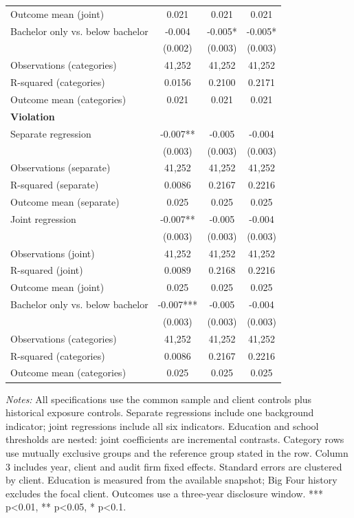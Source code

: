 \begin{table}[htbp]
\begin{threeparttable}
\begin{tabular}{p{}ccc}
Outcome mean (joint) & 0.021 & 0.021 & 0.021 \\
Bachelor only vs. below bachelor & -0.004 & -0.005* & -0.005* \\
 & (0.002) & (0.003) & (0.003) \\
Observations (categories) & 41,252 & 41,252 & 41,252 \\
R-squared (categories) & 0.0156 & 0.2100 & 0.2171 \\
Outcome mean (categories) & 0.021 & 0.021 & 0.021 \\
\multicolumn{4}{l}{\textbf{Violation}} \\
Separate regression & -0.007** & -0.005 & -0.004 \\
 & (0.003) & (0.003) & (0.003) \\
Observations (separate) & 41,252 & 41,252 & 41,252 \\
R-squared (separate) & 0.0086 & 0.2167 & 0.2216 \\
Outcome mean (separate) & 0.025 & 0.025 & 0.025 \\
Joint regression & -0.007** & -0.005 & -0.004 \\
 & (0.003) & (0.003) & (0.003) \\
Observations (joint) & 41,252 & 41,252 & 41,252 \\
R-squared (joint) & 0.0089 & 0.2168 & 0.2216 \\
Outcome mean (joint) & 0.025 & 0.025 & 0.025 \\
Bachelor only vs. below bachelor & -0.007*** & -0.005 & -0.004 \\
 & (0.003) & (0.003) & (0.003) \\
Observations (categories) & 41,252 & 41,252 & 41,252 \\
R-squared (categories) & 0.0086 & 0.2167 & 0.2216 \\
Outcome mean (categories) & 0.025 & 0.025 & 0.025 \\
\bottomrule
\end{tabular}
\begin{tablenotes}\footnotesize
\item \raggedright \textit{Notes:} All specifications use the common sample and client controls plus historical exposure controls. Separate regressions include one background indicator; joint regressions include all six indicators. Education and school thresholds are nested: joint coefficients are incremental contrasts. Category rows use mutually exclusive groups and the reference group stated in the row. Column 3 includes year, client and audit firm fixed effects. Standard errors are clustered by client. Education is measured from the available snapshot; Big Four history excludes the focal client. Outcomes use a three-year disclosure window. *** p<0.01, ** p<0.05, * p<0.1.
\end{tablenotes}
\end{threeparttable}
\end{table}

